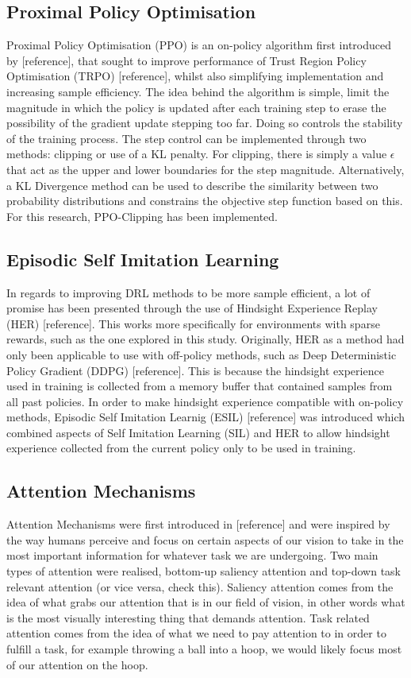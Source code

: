 \documentclass{article}
\begin{document}
\subsection{Proximal Policy Optimisation}
Proximal Policy Optimisation (PPO) is an on-policy algorithm first introduced by [reference], that sought to improve performance of Trust Region Policy Optimisation (TRPO) [reference], whilst also simplifying implementation and increasing sample efficiency. The idea behind the algorithm is simple, limit the magnitude in which the policy is updated after each training step to erase the possibility of the gradient update stepping too far. Doing so controls the stability of the training process. The step control can be implemented through two methods: clipping or use of a KL penalty. For clipping, there is simply a value $\epsilon$ that act as the upper and lower boundaries for the step magnitude. Alternatively, a KL Divergence method can be used to describe the similarity between two probability distributions and constrains the objective step function based on this. For this research, PPO-Clipping has been implemented.
\subsection{Episodic Self Imitation Learning}
In regards to improving DRL methods to be more sample efficient, a lot of promise has been presented through the use of Hindsight Experience Replay (HER) [reference]. This works more specifically for environments with sparse rewards, such as the one explored in this study. Originally, HER as a method had only been applicable to use with off-policy methods, such as Deep Deterministic Policy Gradient (DDPG) [reference]. This is because the hindsight experience used in training is collected from a memory buffer that contained samples from all past policies. In order to make hindsight experience compatible with on-policy methods, Episodic Self Imitation Learnig (ESIL) [reference] was introduced which combined aspects of Self Imitation Learning (SIL) and HER to allow hindsight experience collected from the current policy only to be used in training.
\subsection{Attention Mechanisms}
Attention Mechanisms were first introduced in [reference] and were inspired by the way humans perceive and focus on certain aspects of our vision to take in the most important information for whatever task we are undergoing. Two main types of attention were realised, bottom-up saliency attention and top-down task relevant attention (or vice versa, check this). Saliency attention comes from the idea of what grabs our attention that is in our field of vision, in other words what is the most visually interesting thing that demands attention. Task related attention comes from the idea of what we need to pay attention to in order to fulfill a task, for example throwing a ball into a hoop, we would likely focus most of our attention on the hoop.
\end{document}
